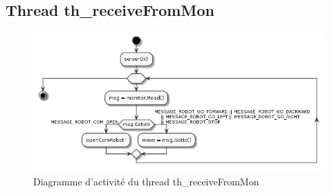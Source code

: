 \documentclass[11pt,a4paper]{paper}
\begin{document}
\subsection{Thread th\_receiveFromMon}
%
 \begin{figure}[htbp]
\begin{center}
\includegraphics[scale=0.4]{figures_pdf/activity/th_receiveFromMon}
\end{center}
\caption{Diagramme d'activité du thread th\_receiveFromMon}
\end{figure}
\FloatBarrier
\end{document}
